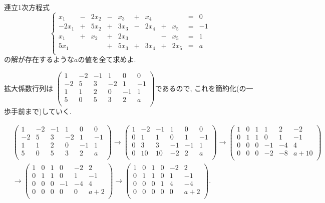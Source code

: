 \documentclass[dvipdfmx,a4paper,11pt]{article}
\theoremstyle{definition}
\begin{document}
連立1次方程式
 $$
 \left\{ 
\begin{array}{ccccccccccc}
x_1&-&2x_2&  -&x_3	&+&x_4& &	&=& 0\\
-2x_1&+&5x_2& + &3x_3&-&2x_4&+&x_5&= &-1 \\
x_1&+&x_2& + &2x_3& &    &-&x_5&= &1\\
5x_1& & & + &5x_3& +&3x_4   &+&2x_5&= &a\\
\end{array}
\right.
 $$
の解が存在するような$a$の値を全て求めよ.
 
  \vspace{11pt}
 
\hspace{-11pt}{\Large $\bullet$ 第6問解答例.}
拡大係数行列は
$
\begin{pmatrix}
1&-2&-1&1&0&0\\
-2&5&3&-2&1&-1\\
1&1&2&0&-1&1\\
5&0&5&3&2&a\\
 \end{pmatrix}
 $であるので, これを簡約化(の一歩手前まで)していく.
 
  \begin{align*}
 &\begin{pmatrix}
1&-2&-1&1&0&0\\
-2&5&3&-2&1&-1\\
1&1&2&0&-1&1\\
5&0&5&3&2&a\\
 \end{pmatrix}
 \overset{}{\longrightarrow} 
 \begin{pmatrix}
1&-2&-1&1&0&0\\
0&1&1&0&1&-1\\
0&3&3&-1&-1&1\\
0&10&10&-2&2&a\\
 \end{pmatrix}
  \overset{}{\longrightarrow} 
 \begin{pmatrix}
1&0&1&1&2&-2\\
0&1&1&0&1&-1\\
0&0&0&-1&-4&4\\
0&0&0&-2&-8&a+10\\
 \end{pmatrix}\\
& \overset{}{\longrightarrow} 
 \begin{pmatrix}
1&0&1&0&-2&2\\
0&1&1&0&1&-1\\
0&0&0&-1&-4&4\\
0&0&0&0&0&a+2\\
 \end{pmatrix} 
 \overset{}{\longrightarrow} 
 \begin{pmatrix}
1&0&1&0&-2&2\\
0&1&1&0&1&-1\\
0&0&0&1&4&-4\\
0&0&0&0&0&a+2\\
 \end{pmatrix}.
 \end{align*}
\end{document}
